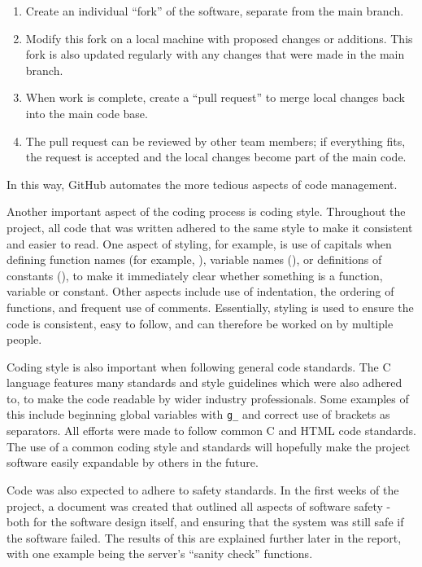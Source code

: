 \begin{enumerate}
	\item Create an individual ``fork'' of the software, separate from the main branch.
	\item Modify this fork on a local machine with proposed changes or additions. This fork is also updated regularly with any changes that were made in the main branch.
	\item When work is complete, create a ``pull request'' to merge local changes back into the main code base.
	\item The pull request can be reviewed by other team members; if everything fits, the request is accepted and the local changes become part of the main code. 
\end{enumerate}
In this way, GitHub automates the more tedious aspects of code management.

Another important aspect of the coding process is coding style. Throughout the project, all code that was written adhered to the same style to make it consistent and easier to read. One aspect of styling, for example, is use of capitals when defining function names (for example, ), variable names (), or definitions of constants (), to make it immediately clear whether something is a function, variable or constant. Other aspects include use of indentation, the ordering of functions, and frequent use of comments. Essentially, styling is used to ensure the code is consistent, easy to follow, and can therefore be worked on by multiple people. 

Coding style is also important when following general code standards. The C language features many standards and style guidelines which were also adhered to, to make the code readable by wider industry professionals. Some examples of this include beginning global variables with \texttt{g_} and correct use of brackets as separators\cite{mellon}. All efforts were made to follow common C and HTML code standards. The use of a common coding style and standards will hopefully make the project software easily expandable by others in the future.


Code was also expected to adhere to safety standards. In the first weeks of the project, a document\cite{kruger_safety} was created that outlined all aspects of software safety - both for the software design itself, and ensuring that the system was still safe if the software failed. The results of this are explained further later in the report, with one example being the server's ``sanity check'' functions.

